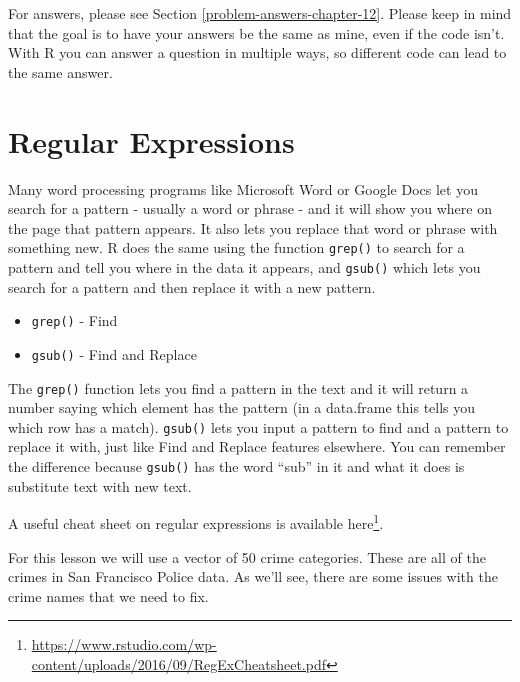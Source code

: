 \documentclass[
]{krantz}
\providecommand{\tightlist}{%
  \setlength{\itemsep}{0pt}\setlength{\parskip}{0pt}}
\renewcommand{\href}[2]{#2\footnote{\url{#1}}}
\begin{document}
For answers, please see Section \ref{problem-answers-chapter-12}. Please keep in mind that the goal is to have your answers be the same as mine, even if the code isn't. With R you can answer a question in multiple ways, so different code can lead to the same answer.

\hypertarget{regular-expressions}{%
\chapter{Regular Expressions}\label{regular-expressions}}

Many word processing programs like Microsoft Word or Google Docs let you search for a pattern - usually a word or phrase - and it will show you where on the page that pattern appears. It also lets you replace that word or phrase with something new. R does the same using the function \texttt{grep()} to search for a pattern and tell you where in the data it appears, and \texttt{gsub()} which lets you search for a pattern and then replace it with a new pattern.

\begin{itemize}
\tightlist
\item
  \texttt{grep()} - Find
\item
  \texttt{gsub()} - Find and Replace
\end{itemize}

The \texttt{grep()} function lets you find a pattern in the text and it will return a number saying which element has the pattern (in a data.frame this tells you which row has a match). \texttt{gsub()} lets you input a pattern to find and a pattern to replace it with, just like Find and Replace features elsewhere. You can remember the difference because \texttt{gsub()} has the word ``sub'' in it and what it does is substitute text with new text.

A useful cheat sheet on regular expressions is available \href{https://www.rstudio.com/wp-content/uploads/2016/09/RegExCheatsheet.pdf}{here}.

For this lesson we will use a vector of 50 crime categories. These are all of the crimes in San Francisco Police data. As we'll see, there are some issues with the crime names that we need to fix.
\end{document}

